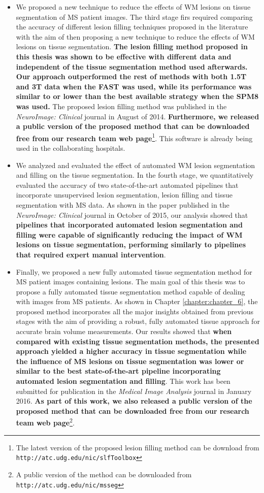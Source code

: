 \begin{itemize}
\item We proposed a new technique to reduce the effects of WM lesions on tissue segmentation of MS patient images. The third stage firs required comparing the accuracy of different  lesion filling techniques proposed in the literature with the aim of then proposing a new technique to reduce the effects of WM lesions on tissue segmentation. \textbf{The lesion filling method proposed in this thesis was shown to be effective with different data and independent of the tissue segmentation method used afterwards. Our approach outperformed the rest of methods with both 1.5T and 3T data when the FAST was used, while its performance was similar to or lower than the best available strategy when the SPM8 was used.} The proposed lesion filling method was  published in the\textit{ NeuroImage: Clinical} journal in August of 2014. \textbf{Furthermore, we released a public version of the proposed method that can be downloaded free from our research team web page}\footnote{The latest version of the proposed lesion filling method can be download from \texttt{http://atc.udg.edu/nic/slfToolbox}}. This software is already being used in the collaborating hospitals.  

\item We analyzed and evaluated the effect of automated WM lesion segmentation and filling on the tissue segmentation. In the fourth stage, we quantitatively evaluated the accuracy of two state-of-the-art automated pipelines that incorporate unsupervised lesion segmentation, lesion filling and tissue segmentation with MS data.  As shown in the paper published in the \textit{NeuroImage: Clinical} journal in October of 2015, our analysis showed that \textbf{pipelines that incorporated automated lesion segmentation and filling were capable of significantly reducing the impact of WM lesions on tissue segmentation, performing similarly to pipelines that required expert manual intervention}.

\item Finally, we proposed a new fully automated tissue segmentation method for MS patient images containing lesions. The main goal of this thesis was to propose a fully automated tissue segmentation method capable of dealing with images from MS patients. As shown in Chapter \ref{chapter:chapter_6}, the proposed method incorporates all the major insights obtained from previous stages with the aim of providing a robust, fully automated tissue approach for accurate brain volume measurements. Our results showed that  \textbf{when compared with existing tissue segmentation methods, the presented approach yielded a higher accuracy in tissue segmentation while the influence of MS lesions on tissue segmentation was lower or similar to the best state-of-the-art pipeline incorporating automated lesion segmentation and filling}. This work has been submitted for publication in the\textit{ Medical Image Analysis} journal in January 2016. \textbf{As part of this work, we also released a public version of the proposed method that can be downloaded free from our research team web page}\footnote{A public version of the method can be downloaded from \texttt{http://atc.udg.edu/nic/msseg}}.


\end{itemize}
